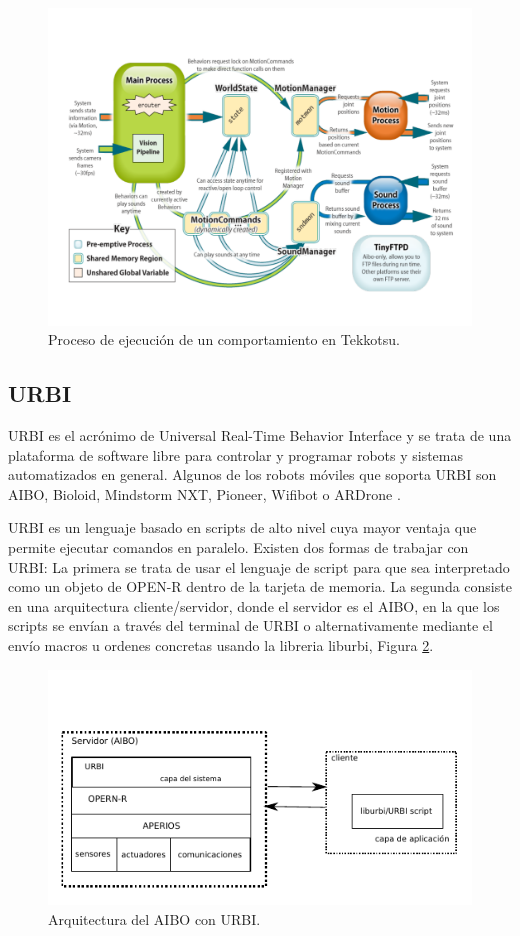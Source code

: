 \documentclass[12pt,a4paper,final,twoside]{book}
\begin{document}
 
\begin{figure}[h!]
	\centering
    \includegraphics[scale=0.3]{images/tekkotsuarch.pdf}
	 \caption{Proceso de ejecución de un comportamiento en Tekkotsu.}
  \label{fig:tekkarch}
\end{figure}

\subsection{URBI}
\label{urbi}
URBI es el acrónimo de Universal Real-Time Behavior Interface y se trata de una plataforma de software libre para controlar y programar robots y sistemas automatizados en general. Algunos de los robots móviles que soporta URBI son AIBO, Bioloid, Mindstorm NXT, Pioneer, Wifibot o ARDrone \cite{urbi}.

URBI es un lenguaje basado en scripts de alto nivel cuya mayor ventaja que permite ejecutar comandos en paralelo. Existen dos formas de trabajar con URBI: La primera  se trata de usar el lenguaje de script para que sea interpretado como un objeto de OPEN-R dentro de la tarjeta de memoria. La segunda consiste en una arquitectura cliente/servidor, donde el servidor es el AIBO, en la que los scripts se envían a través del terminal de URBI o alternativamente mediante el envío macros u ordenes concretas usando la libreria liburbi, Figura \ref{fig:urbiarc}. 

\begin{figure}[h!]
	\centering
    \includegraphics[scale=1.4]{images/urbiarc.pdf}
	 \caption{Arquitectura del AIBO con URBI.}
  \label{fig:urbiarc}
\end{figure}
\end{document}
